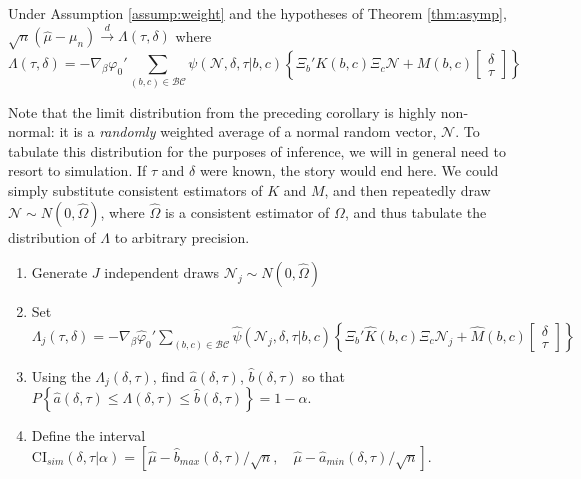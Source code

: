 \begin{cor}
  Under Assumption \ref{assump:weight} and the hypotheses of Theorem \ref{thm:asymp},  
	$\sqrt{n}\left(\widehat{\mu} - \mu_n\right) \overset{d}{\rightarrow} \Lambda(\tau,\delta)$
where
	\begin{equation}
		\Lambda(\tau,\delta) = -\nabla_\beta\varphi_0' \sum_{(b,c) \in \mathcal{BC}} \psi(\mathscr{N},\delta, \tau|b,c) \left\{\Xi_b' K(b,c) \Xi_c \mathscr{N} + M(b,c)  \left[\begin{array}{c}\delta \\ \tau \end{array} \right]\right\}
	\end{equation}
\end{cor}
Note that the limit distribution from the preceding corollary is highly non-normal: it is a \emph{randomly} weighted average of a normal random vector, $\mathscr{N}$.
To tabulate this distribution for the purposes of inference, we will in general need to resort to simulation.
If $\tau$ and $\delta$ were known, the story would end here.
We could simply substitute consistent estimators of $K$ and $M$, and then repeatedly draw $\mathscr{N} \sim N(0, \widehat{\Omega})$, where $\widehat{\Omega}$ is a consistent estimator of $\Omega$, and thus tabulate the distribution of $\Lambda$ to arbitrary precision. 
\begin{alg}
\mbox{}
		\begin{enumerate}
    \item Generate $J$ independent draws $\mathscr{N}_j \sim N(0, \widehat{\Omega})$
			\item Set $\Lambda_j(\tau,\delta)= -\nabla_\beta\widehat{\varphi}_0' \sum_{(b,c) \in \mathcal{BC}} \widehat{\psi}(\mathscr{N}_j,\delta, \tau|b,c) \left\{\Xi_b' \widehat{K}(b,c) \Xi_c \mathscr{N}_j + \widehat{M}(b,c)  \left[\begin{array}{c}\delta \\ \tau \end{array} \right]\right\}$
			\item Using the $\Lambda_j(\delta, \tau)$, find $\widehat{a}(\delta,\tau)$, $\widehat{b}(\delta, \tau)$ so that
		$P\left\{ \widehat{a}(\delta,\tau) \leq\Lambda(\delta,\tau)\leq \widehat{b}(\delta,\tau) \right\} = 1 - \alpha$.
  \item Define the interval $\mbox{CI}_{sim}(\delta,\tau|\alpha)=\left[ \widehat{\mu} - \widehat{b}_{max}(\delta, \tau)/\sqrt{n}, \quad \widehat{\mu} - \widehat{a}_{min}(\delta, \tau)/\sqrt{n} \right]$.
		\end{enumerate}
\end{alg}

